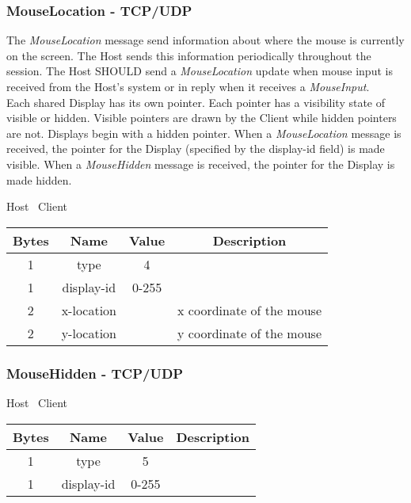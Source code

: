 \subsubsection{MouseLocation - TCP/UDP}

The \emph{MouseLocation} message send information about where the mouse is currently on the screen.
The Host sends this information periodically throughout the session.
The Host SHOULD send a \emph{MouseLocation} update when mouse input is received from the Host's system or in
reply when it receives a \emph{MouseInput}.\\

Each shared Display has its own pointer.
Each pointer has a visibility state of visible or hidden.
Visible pointers are drawn by the Client while hidden pointers are not.
Displays begin with a hidden pointer.
When a \emph{MouseLocation} message is received, the pointer for the Display (specified by the display-id field) is made visible.
When a \emph{MouseHidden} message is received, the pointer for the Display is made hidden.

\begin{center}
    Host \textrightarrow\ Client\\
    \begin{tabular}{|c|c|c|c|}
        \hline
        \textbf{Bytes} & \textbf{Name} & \textbf{Value} & \textbf{Description}      \\
        \hline
        1              & type          & 4              &                           \\
        \hline
        1              & display-id    & 0-255          &                           \\
        \hline
        2              & x-location    &                & x coordinate of the mouse \\
        \hline
        2              & y-location    &                & y coordinate of the mouse \\
        \hline
    \end{tabular}
\end{center}

\subsubsection{MouseHidden - TCP/UDP}

\begin{center}
    Host \textrightarrow\ Client\\
    \begin{tabular}{|c|c|c|c|}
        \hline
        \textbf{Bytes} & \textbf{Name} & \textbf{Value} & \textbf{Description} \\
        \hline
        1              & type          & 5              &                      \\
        \hline
        1              & display-id    & 0-255          &                      \\
        \hline
    \end{tabular}
\end{center}

